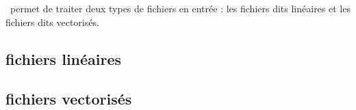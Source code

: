 \documentclass[manual-fr.tex]{subfiles}
\begin{document}
\SEM\ permet de traiter deux types de fichiers en entrée : les fichiers dits linéaires et les fichiers dits vectorisés.

\subsection{fichiers linéaires}


\subsection{fichiers vectorisés}

\end{document}
